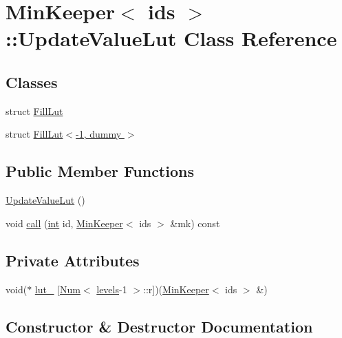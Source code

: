 \hypertarget{classMinKeeper_1_1UpdateValueLut}{}\section{Min\+Keeper$<$ ids $>$\+:\+:Update\+Value\+Lut Class Reference}
\label{classMinKeeper_1_1UpdateValueLut}
\subsection*{Classes}
\begin{DoxyCompactItemize}
\item 
struct \hyperlink{structMinKeeper_1_1UpdateValueLut_1_1FillLut}{Fill\+Lut}
\item 
struct \hyperlink{structMinKeeper_1_1UpdateValueLut_1_1FillLut_3-1_00_01dummy_01_4}{Fill\+Lut$<$-\/1, dummy $>$}
\end{DoxyCompactItemize}
\subsection*{Public Member Functions}
\begin{DoxyCompactItemize}
\item 
\hyperlink{classMinKeeper_1_1UpdateValueLut_a39d59032e73088e2d7b6e8da27a6fbda}{Update\+Value\+Lut} ()
\item 
void \hyperlink{classMinKeeper_1_1UpdateValueLut_ab8897ae5eca6cab87607eea12e90f3c5}{call} (\hyperlink{ioapi_8h_a787fa3cf048117ba7123753c1e74fcd6}{int} id, \hyperlink{classMinKeeper}{Min\+Keeper}$<$ ids $>$ \&mk) const
\end{DoxyCompactItemize}
\subsection*{Private Attributes}
\begin{DoxyCompactItemize}
\item 
void($\ast$ \hyperlink{classMinKeeper_1_1UpdateValueLut_a4d69b64613b84dea77264ef5f8947ce5}{lut\+\_\+} \mbox{[}\hyperlink{structMinKeeper_1_1Num}{Num}$<$ \hyperlink{classMinKeeper_a745fcad4766af72248c4f26e8fb5b754aea945fa5cad053f00154ef3bf621ea51}{levels}-\/1 $>$\+::r\mbox{]})(\hyperlink{classMinKeeper}{Min\+Keeper}$<$ ids $>$ \&)
\end{DoxyCompactItemize}


\subsection{Constructor \& Destructor Documentation}
\mbox{\label{classMinKeeper_1_1UpdateValueLut_a39d59032e73088e2d7b6e8da27a6fbda}} 
